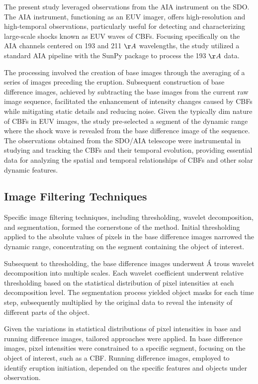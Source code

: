The present study leveraged observations from the AIA instrument on the SDO. The AIA instrument, functioning as an EUV imager, offers high-resolution and high-temporal observations, particularly useful for detecting and characterizing large-scale shocks known as EUV waves of CBFs. Focusing specifically on the AIA channels centered on 193 and 211 $\AA$ wavelengths, the study utilized a standard AIA pipeline with the SunPy package to process the 193 $\AA$ data.

The processing involved the creation of base images through the averaging of a series of images preceding the eruption. Subsequent construction of base difference images, achieved by subtracting the base images from the current raw image sequence, facilitated the enhancement of intensity changes caused by CBFs while mitigating static details and reducing noise. Given the typically dim nature of CBFs in EUV images, the study pre-selected a segment of the dynamic range where the shock wave is revealed from the base difference image of the sequence. The observations obtained from the SDO/AIA telescope were instrumental in studying and tracking the CBFs and their temporal evolution, providing essential data for analyzing the spatial and temporal relationships of CBFs and other solar dynamic features.

\subsection{Image Filtering Techniques}
Specific image filtering techniques, including thresholding, wavelet decomposition, and segmentation, formed the cornerstone of the method. Initial thresholding applied to the absolute values of pixels in the base difference images narrowed the dynamic range, concentrating on the segment containing the object of interest.

Subsequent to thresholding, the base difference images underwent \'A trous wavelet decomposition into multiple scales. Each wavelet coefficient underwent relative thresholding based on the statistical distribution of pixel intensities at each decomposition level. The segmentation process yielded object masks for each time step, subsequently multiplied by the original data to reveal the intensity of different parts of the object.

Given the variations in statistical distributions of pixel intensities in base and running difference images, tailored approaches were applied. In base difference images, pixel intensities were constrained to a specific segment, focusing on the object of interest, such as a CBF. Running difference images, employed to identify eruption initiation, depended on the specific features and objects under observation.

